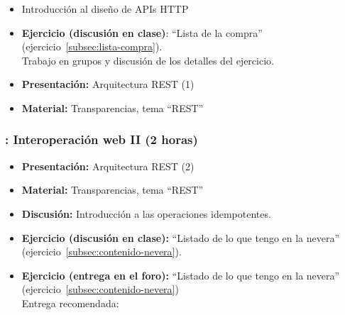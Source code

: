 \documentclass[a4paper,12pt]{article}
\begin{document}
\begin{itemize}
\item Introducción al diseño de APIs HTTP
\item \textbf{Ejercicio (discusión en clase)}: ``Lista de la compra'' (ejercicio~\ref{subsec:lista-compra}). \\
  Trabajo en grupos y discusión de los detalles del ejercicio.
\item \textbf{Presentación:} Arquitectura REST (1)
\item \textbf{Material:} Transparencias, tema ``REST''
\end{itemize}

\subsubsection{\lunesG: Interoperación web II (2 horas)}
\label{cal:lunesG}

\begin{itemize}
\item \textbf{Presentación:} Arquitectura REST (2)
\item \textbf{Material:} Transparencias, tema ``REST''
\item \textbf{Discusión:} Introducción a las operaciones idempotentes.
\item \textbf{Ejercicio (discusión en clase):} ``Listado de lo que tengo en la nevera'' (ejercicio~\ref{subsec:contenido-nevera}).  
\item \textbf{Ejercicio (entrega en el foro):} ``Listado de lo que tengo en la nevera'' (ejercicio~\ref{subsec:contenido-nevera}) \\
  Entrega recomendada: \lunesH
\end{itemize}


\end{document}
